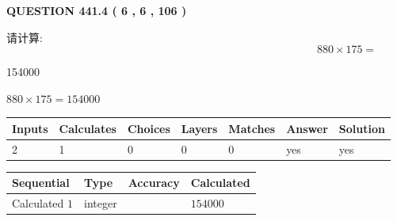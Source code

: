 \documentclass{ctexart}
\begin{document}
   
  
\vspace{0.2in}
  
{\textbf{\Large{QUESTION
441.4 
 ( 6 , 6 , 106 )
}}}
  
  
 
请计算:
\begin{equation}
880  \times    %
175 = \nonumber
\end{equation}
 
 
 
\noindent{}
 
 

154000
 
 
\noindent{}
 
 

 
 
 
\noindent{}
 
 

$ %
880 \times  %
175=   %
154000$
 
 
\noindent{}
 
 

 
   
   
   
   
\noindent\begin{tabular}{|l|l|l|l|l|l|l|}
 \hline
Inputs & Calculates & Choices & Layers & Matches & Answer & Solution \\ \hline
 2  & 
 1  & 
 0
  & 
 0  & 
 0  & 
  yes & 
  yes 
  \\ \hline
 \end{tabular}
   
   
   
   
\noindent{}
   
   
  
  
\noindent\begin{tabular}{|l|l|l|l|}
\hline
 Sequential & Type & Accuracy & Calculated \\ 
\hline
 
 
  Calculated $  1 $ & integer &  & 
  $ 154000 $ 
 \\  \hline  
 \end{tabular}
   
\end{document}
